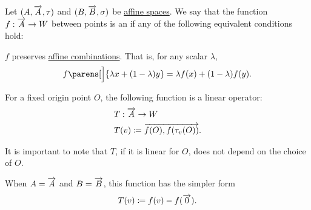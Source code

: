 \begin{definition}\label{def:affine_operator}
  Let \( (A, \overrightarrow{A}, \tau) \) and \( (B, \overrightarrow{B}, \sigma) \) be \hyperref[def:affine_space]{affine spaces}. We say that the function \( {f: \overrightarrow{A} \to W} \) between points is an  if any of the following equivalent conditions hold:
  \begin{thmenum}
     \( f \) preserves \hyperref[def:affine_hull]{affine combinations}. That is, for any scalar \( \lambda \),
    \begin{equation}\label{eq:def:affine_operator/combination}
      f\parens[\Big]{ \lambda x + (1 - \lambda) y } = \lambda f(x) + (1 - \lambda) f(y).
    \end{equation}

     For a fixed origin point \( O \), the following function is a linear operator:
    \begin{equation}\label{eq:def:affine_operator/translation/general}
      \begin{aligned}
        &T: \overrightarrow{A} \to W \\
        &T(v) \coloneqq \overrightarrow{ f(O), f(\tau_v(O)) }.
      \end{aligned}
    \end{equation}

    It is important to note that \( T \), if it is linear for \( O \), does not depend on the choice of \( O \).

    When \( A = \overrightarrow{A} \) and \( B = \overrightarrow{B} \), this function has the simpler form
    \begin{equation}\label{eq:def:affine_operator/translation/natural}
      T(v) \coloneqq f(v) - f(\overrightarrow{0}).
    \end{equation}
  \end{thmenum}
\end{definition}

